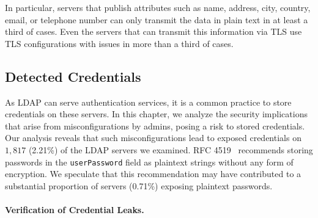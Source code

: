 In particular, servers that publish attributes such as name, address, city, country, email, or telephone number can only transmit the data in plain text in at least a third of cases. Even the servers that can transmit this information via TLS use TLS configurations with issues in more than a third of cases.









\subsection{Detected Credentials}
\label{subsec:05:credentialAnalysis}

As LDAP can serve authentication services, it is a common practice to store credentials on these servers. In this chapter, we analyze the security implications that arise from misconfigurations by admins, posing a risk to stored credentials. Our analysis reveals that such misconfigurations lead to exposed credentials on $1,817$ (2.21\%) of the LDAP servers we examined.
RFC 4519~\cite{RFC4519} recommends storing passwords in the \texttt{userPassword} field as plaintext strings without any form of encryption. We speculate that this recommendation may have contributed to a substantial proportion of servers (0.71\%) exposing plaintext passwords. 


\paragraph{Verification of Credential Leaks.}

